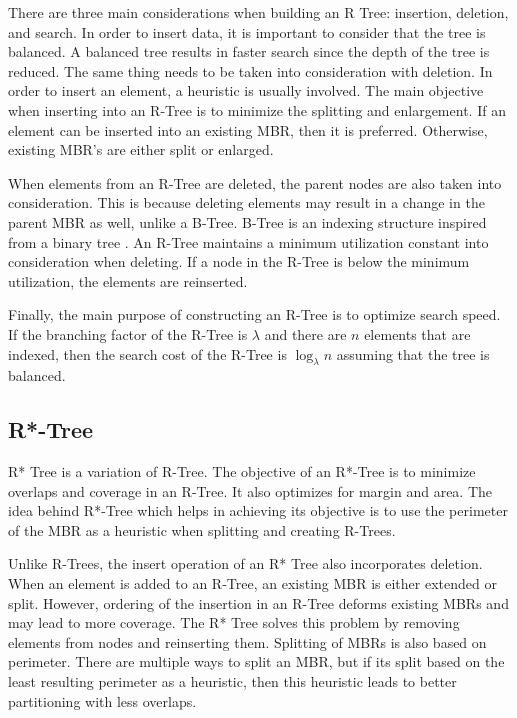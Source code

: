 There are three main considerations when building an R Tree: insertion, deletion, and search. In order to insert data, it is important to consider that the tree is balanced. A balanced tree results in faster search since the depth of the tree is reduced. The same thing needs to be taken into consideration with deletion.
In order to insert an element, a heuristic is usually involved. The main objective when inserting into an R-Tree is to minimize the splitting and enlargement. If an element can be inserted into an existing MBR, then it is preferred. Otherwise, existing MBR's are either split or enlarged.

When elements from an R-Tree are deleted, the parent nodes are also taken into consideration. This is because deleting elements may result in a change in the parent MBR as well, unlike a B-Tree. B-Tree is an indexing structure inspired from a binary tree \citep{bayer1970organization}. An R-Tree maintains a minimum utilization constant into consideration when deleting. If a node in the R-Tree is below the minimum utilization, the elements are reinserted.

Finally, the main purpose of constructing an R-Tree is to optimize search speed. If the branching factor of the R-Tree is $\lambda$ and there are $n$ elements that are indexed, then the search cost of the R-Tree is $\log_{\lambda}{n}$ assuming that the tree is balanced.


\subsection{R*-Tree}
R* Tree is a variation of R-Tree\citep{beckmann1990r}. The objective of an R*-Tree is to minimize overlaps and coverage in an R-Tree. It also optimizes for margin and area. The idea behind R*-Tree which helps in achieving its objective is to use the perimeter of the MBR as a heuristic when splitting and creating R-Trees.

Unlike R-Trees, the insert operation of an R* Tree also incorporates deletion. When an element is added to an R-Tree, an existing MBR is either extended or split. However, ordering of the insertion in an R-Tree deforms existing MBRs and may lead to more coverage. The R* Tree solves this problem by removing elements from nodes and reinserting them. Splitting of MBRs is also based on perimeter. There are multiple ways to split an MBR, but if its split based on the least resulting perimeter as a heuristic, then this heuristic leads to better partitioning with less overlaps.

